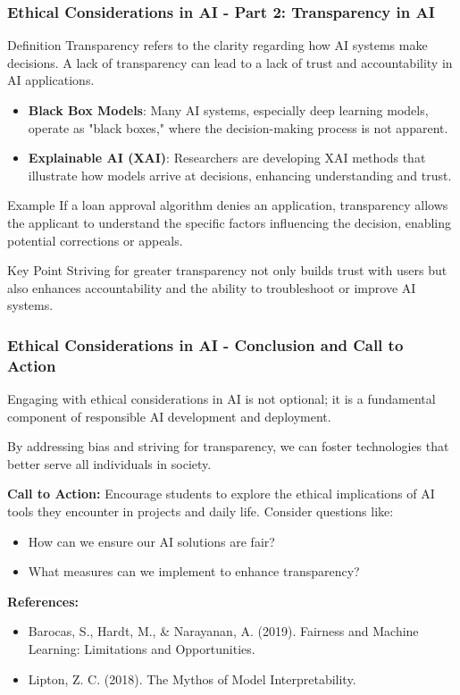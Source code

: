 \documentclass[aspectratio=169]{beamer}
\begin{document}
\begin{frame}[fragile]
    \frametitle{Ethical Considerations in AI - Part 2: Transparency in AI}
    \begin{block}{Definition}
    Transparency refers to the clarity regarding how AI systems make decisions. A lack of transparency can lead to a lack of trust and accountability in AI applications.
    \end{block}
    
    \begin{itemize}
        \item \textbf{Black Box Models}: Many AI systems, especially deep learning models, operate as "black boxes," where the decision-making process is not apparent.
        \item \textbf{Explainable AI (XAI)}: Researchers are developing XAI methods that illustrate how models arrive at decisions, enhancing understanding and trust.
    \end{itemize}
    
    \begin{block}{Example}
    If a loan approval algorithm denies an application, transparency allows the applicant to understand the specific factors influencing the decision, enabling potential corrections or appeals.
    \end{block}
    
    \begin{block}{Key Point}
    Striving for greater transparency not only builds trust with users but also enhances accountability and the ability to troubleshoot or improve AI systems.
    \end{block}
\end{frame}

\begin{frame}[fragile]
    \frametitle{Ethical Considerations in AI - Conclusion and Call to Action}
    Engaging with ethical considerations in AI is not optional; it is a fundamental component of responsible AI development and deployment. 

    By addressing bias and striving for transparency, we can foster technologies that better serve all individuals in society.

    \textbf{Call to Action:}
    Encourage students to explore the ethical implications of AI tools they encounter in projects and daily life. Consider questions like:
    \begin{itemize}
        \item How can we ensure our AI solutions are fair?
        \item What measures can we implement to enhance transparency?
    \end{itemize}
    
    \textbf{References:}
    \begin{itemize}
        \item Barocas, S., Hardt, M., \& Narayanan, A. (2019). Fairness and Machine Learning: Limitations and Opportunities.
        \item Lipton, Z. C. (2018). The Mythos of Model Interpretability.
    \end{itemize}
\end{frame}
\end{document}
